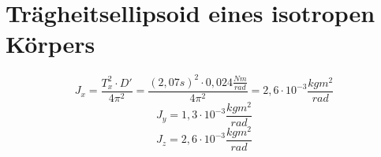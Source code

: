 \documentclass[12pt,a4paper,]{scrreprt}
\begin{document}
            
        \section{Trägheitsellipsoid eines isotropen Körpers}
        
            \begin{equation}
            	J_{x} = \frac{T_{x}^2 \cdot D'}{4\pi^2} = \frac{(2,07s)^2 \cdot 0,024 \frac{Nm}{rad}}{4\pi^2} = 2,6 \cdot 10^{-3}\frac{kgm^2}{rad} 
            \end{equation}
            \begin{equation}
            	J_{y} = 1,3 \cdot 10^{-3}\frac{kgm^2}{rad}
            \end{equation}
            \begin{equation}
            	J_{z} = 2,6 \cdot 10^{-3}\frac{kgm^2}{rad}
            \end{equation}
            
\end{document}
